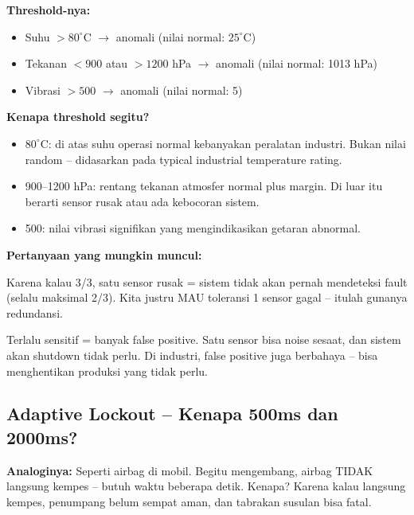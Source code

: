 \documentclass[12pt,a4paper]{article}
\begin{document}
\textbf{Threshold-nya:}
\begin{itemize}[nosep]
    \item Suhu $> 80^{\circ}\mathrm{C}$ $\rightarrow$ anomali (nilai normal: $25^{\circ}\mathrm{C}$)
    \item Tekanan $< 900$ atau $> 1200$ hPa $\rightarrow$ anomali (nilai normal: 1013 hPa)
    \item Vibrasi $> 500$ $\rightarrow$ anomali (nilai normal: 5)
\end{itemize}

\textbf{Kenapa threshold segitu?}
\begin{itemize}[nosep]
    \item $80^{\circ}\mathrm{C}$: di atas suhu operasi normal kebanyakan peralatan industri. Bukan nilai
          random -- didasarkan pada typical industrial temperature rating.
    \item 900--1200 hPa: rentang tekanan atmosfer normal plus margin. Di luar itu
          berarti sensor rusak atau ada kebocoran sistem.
    \item 500: nilai vibrasi signifikan yang mengindikasikan getaran abnormal.
\end{itemize}

\textbf{Pertanyaan yang mungkin muncul:}

\begin{description}[nosep,leftmargin=2em,style=nextline]
    \item[Kenapa tidak 3/3 saja biar lebih aman?]
    Karena kalau 3/3, satu sensor rusak = sistem tidak akan pernah mendeteksi fault
    (selalu maksimal 2/3). Kita justru MAU toleransi 1 sensor gagal -- itulah gunanya
    redundansi.

    \item[Kenapa tidak 1/3? Kan lebih sensitif?]
    Terlalu sensitif = banyak false positive. Satu sensor bisa noise sesaat, dan
    sistem akan shutdown tidak perlu. Di industri, false positive juga berbahaya
    -- bisa menghentikan produksi yang tidak perlu.
\end{description}

\subsection{Adaptive Lockout -- Kenapa 500ms dan 2000ms?}

\textbf{Analoginya:} Seperti airbag di mobil. Begitu mengembang, airbag TIDAK
langsung kempes -- butuh waktu beberapa detik. Kenapa? Karena kalau langsung
kempes, penumpang belum sempat aman, dan tabrakan susulan bisa fatal.
\end{document}
